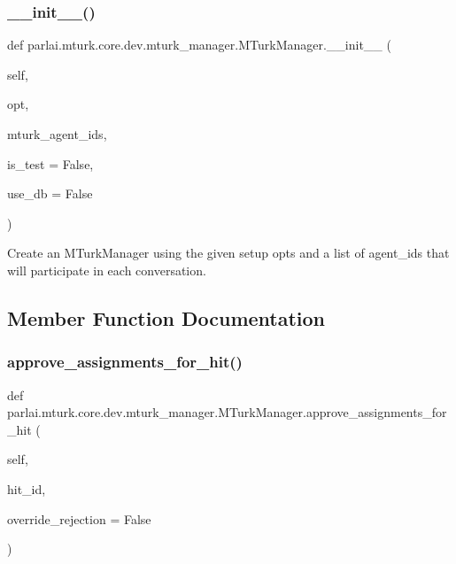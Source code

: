 \subsubsection{\texorpdfstring{\+\_\+\+\_\+init\+\_\+\+\_\+()}{\_\_init\_\_()}}
{\footnotesize\ttfamily def parlai.\+mturk.\+core.\+dev.\+mturk\+\_\+manager.\+M\+Turk\+Manager.\+\_\+\+\_\+init\+\_\+\+\_\+ (\begin{DoxyParamCaption}\item[{}]{self,  }\item[{}]{opt,  }\item[{}]{mturk\+\_\+agent\+\_\+ids,  }\item[{}]{is\+\_\+test = {\ttfamily False},  }\item[{}]{use\+\_\+db = {\ttfamily False} }\end{DoxyParamCaption})}

\begin{DoxyVerb}Create an MTurkManager using the given setup opts and a list of agent_ids that
will participate in each conversation.
\end{DoxyVerb}
 

\subsection{Member Function Documentation}
\mbox{\label{classparlai_1_1mturk_1_1core_1_1dev_1_1mturk__manager_1_1MTurkManager_ab77c6bdccf256625b918d0215b7bfcdf}} 
\subsubsection{\texorpdfstring{approve\+\_\+assignments\+\_\+for\+\_\+hit()}{approve\_assignments\_for\_hit()}}
{\footnotesize\ttfamily def parlai.\+mturk.\+core.\+dev.\+mturk\+\_\+manager.\+M\+Turk\+Manager.\+approve\+\_\+assignments\+\_\+for\+\_\+hit (\begin{DoxyParamCaption}\item[{}]{self,  }\item[{}]{hit\+\_\+id,  }\item[{}]{override\+\_\+rejection = {\ttfamily False} }\end{DoxyParamCaption})}

